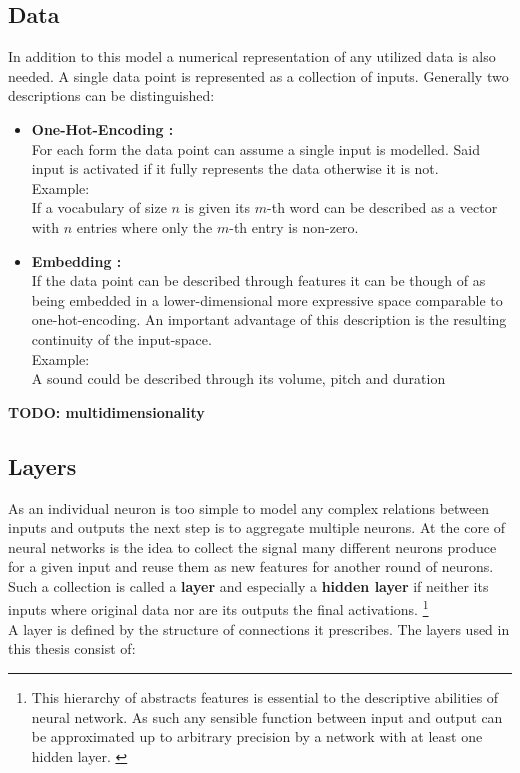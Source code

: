 \subsection{Data}
In addition to this model a numerical representation of any utilized data is also needed. A single data point is represented as a collection of inputs. Generally two descriptions can be distinguished:
\begin{itemize}
	\item \textbf{One-Hot-Encoding :}\\
	For each form the data point can assume a single input is modelled. Said input is activated if it fully represents the data otherwise it is not.\\
	Example:\\
	If a vocabulary of size $n$ is given its $m$-th word can be described as a vector with $n$ entries where only the $m$-th entry is non-zero.
	\item \textbf{Embedding :}\\
	If the data point can be described through features it can be though of as being embedded in a lower-dimensional more expressive space comparable to one-hot-encoding. An important advantage of this description is the resulting continuity of the input-space.\\
	Example: \\
	A sound could be described through its volume, pitch and duration
\end{itemize} 

\textbf{TODO: multidimensionality}

\subsection{Layers}
As an individual neuron is too simple to model any complex relations between inputs and outputs the next step is to aggregate multiple neurons. At the core of neural networks is the idea to collect the signal many different neurons produce for a given input and reuse them as new features for another round of neurons. Such a collection is called a \textbf{layer} and especially a \textbf{hidden layer} if neither its inputs where original data nor are its outputs the final activations. \footnote{
	This hierarchy of abstracts features is essential to the descriptive abilities of neural network. As such any sensible function between input and output can be approximated up to arbitrary precision by a network with at least one hidden layer. \cite{universal}
	}\\
A layer is defined by the structure of connections it prescribes. The layers used in this thesis consist of:

